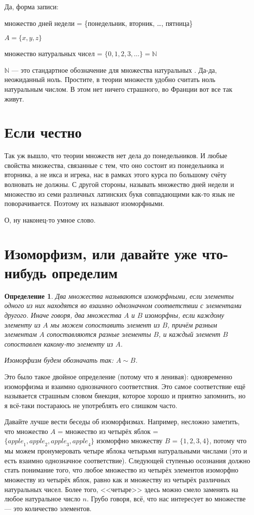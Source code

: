 \documentclass[12pt, onecolumn]{report}
\newtheorem{definition}{Определение}
\begin{document}
Да, форма записи:

множество дней недели = \{понедельник, вторник, \ldots , пятница\}

$A = \{x, y, z \}$

множество натуральных чисел = $\{0, 1, 2, 3, \ldots \} = \mathbb N$ 

$ \mathbb N$ --- это стандартное обозначение для множества натуральных . Да-да, неожиданный ноль. Простите, в теории множеств удобно считать ноль натуральным числом. В этом нет ничего страшного, во Франции вот все так живут.

\section{Если честно}
Так уж вышло, что теории множеств нет дела до понедельников. И любые свойства множества, связанные с тем, что оно состоит из понедельника и вторника, а не икса и игрека, нас в рамках этого курса по большому счёту волновать не должны. С другой стороны, называть множество дней недели и множество из семи различных латинских букв совпадающими как-то язык не поворачивается. Поэтому их называют изоморфными.

О, ну наконец-то умное слово.
\section{Изоморфизм, или давайте уже что-нибудь определим}
\begin{definition} Два множества называются изоморфными, если элементы одного из них находятся во взаимно однозначном соответствии с элементами другого. Иначе говоря, два множества $A$ и $B$ изоморфны, если каждому элементу из $A$ мы можем сопоставить элемент из $B$, причём разным элементам $A$ сопоставляются разные элементы $B$, и каждый элемент $B$ сопоставлен какому-то элементу из $A$.

Изоморфизм будем обозначать так: $A \sim B$.
\end{definition}
Это было такое двойное определение (потому что я ленивая): одновременно изоморфизма и взаимно однозначного соответствия. Это самое соответствие ещё называется страшным словом биекция, которое хорошо и приятно запомнить, но я всё-таки постараюсь не употреблять его слишком часто.

Давайте лучше вести беседы об изоморфизмах. Например, несложно заметить, что множество $A$ = множество из четырёх яблок = \linebreak  $\{{apple}_1, {apple}_2, {apple}_3, {apple}_4\}$ изоморфно множеству $B$ = $\{1, 2, 3, 4\}$, потому что мы можем пронумеровать четыре яблока четырьмя натуральными числами (это и есть взаимно однозначное соответствие). Следующей ступенью осознания должно стать понимание того, что любое множество из четырёх элементов изоморфно множеству из четырёх яблок, равно как и множеству из четырёх различных натуральных чисел. Более того, <<четыре>> здесь можно смело заменять на любое натуральное число $n$. Грубо говоря, всё, что нас интересует во множестве --- это количество элементов.
\end{document}
